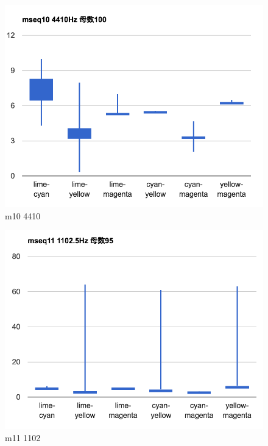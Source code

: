 \begin{figure}[p]
  \centering
  \includegraphics[clip,width=1.05\hsize]{img/m10_4410.png}
  \caption{m10 4410}\label{fig:m10Z4410}
\end{figure}

\begin{figure}[p]
  \centering
  \includegraphics[clip,width=1.05\hsize]{img/m11_1102.png}
  \caption{m11 1102}\label{fig:m11Z1102}
\end{figure}

